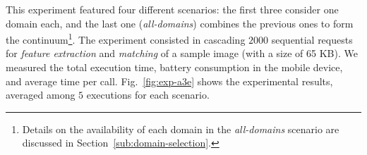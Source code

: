 This experiment featured four different scenarios: the first three consider one domain each, and the last one (\textit{all-domains}) combines the previous ones to form the continuum\footnote{Details on the availability of each domain in the \textit{all-domains} scenario are discussed in Section~\ref{sub:domain-selection}.}. The experiment consisted in cascading $2000$ sequential requests for \textit{feature extraction} and \textit{matching} of a sample image (with a size of 65 KB). We measured the total execution time, battery consumption in the mobile device, and average time per call. Fig.~\ref{fig:exp-a3e} shows the experimental results, averaged among $5$ executions for each scenario.

